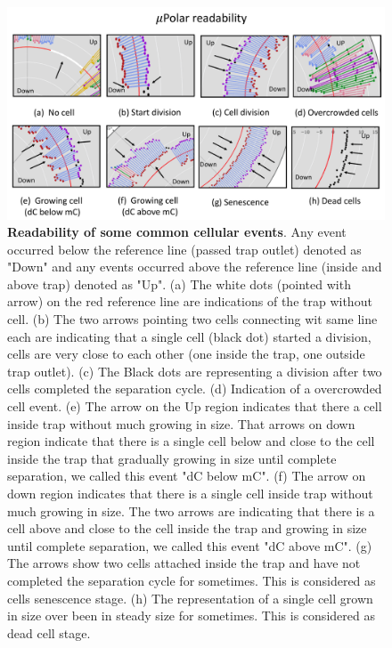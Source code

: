 \documentclass[conference]{IEEEtran}
\begin{document}
\begin{figure}
\centering
\includegraphics[width=\textwidth,height=10 cm]{Patterns/read.pdf}
\caption{\textbf{Readability of some common cellular events}. Any event occurred below the reference line (passed trap outlet) denoted as "Down" and any events occurred above the reference line (inside and above trap) denoted as "Up". (a) The white dots (pointed with arrow) on the red reference line are indications of the trap without cell. (b) The two arrows pointing two cells connecting wit same  line each are indicating that a single cell (black dot) started a division, cells are very close to each other (one inside the trap, one outside trap outlet). (c) The Black dots are representing a division after two cells completed the separation cycle. (d) Indication of a overcrowded cell event. (e) The arrow on the Up region indicates that there a cell inside trap without much growing in size. That arrows on down region indicate that there is a single cell below and close to the cell inside the trap that gradually growing in size until complete separation, we called this event "dC below mC". (f) The arrow on down region indicates that there is a single cell inside trap without much growing in size. The two arrows are indicating that there is a cell above and close to the cell inside the trap and growing in size until complete separation, we called this event "dC above mC". (g) The arrows show two cells attached inside the trap and have not completed the separation cycle for sometimes. This is considered as cells senescence stage. (h) The representation of a single cell grown in size over been in steady size for sometimes. This is considered as dead cell stage.}

\label{fig:read}
\end{figure}
\end{document}
